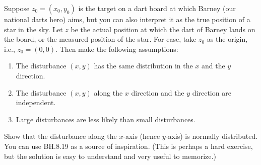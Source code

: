 \begin{exercise}\label{ex:1}
Suppose $z_0=(x_0,y_{0})$ is the target on a dart board at which Barney (our national darts hero) aims, but you can also interpret it as the true position of a star in the sky.
Let $z$ be the actual position at which the dart of Barney lands on the board, or the measured position of the star.
For ease, take $z_0$ as the origin, i.e., $z_0=(0,0)$.
Then make the following assumptions:
\begin{enumerate}
\item The disturbance $(x,y)$ has the same distribution in the $x$ and the $y$ direction.
\item The disturbance $(x,y)$ along the $x$ direction and the $y$ direction are independent.
\item Large disturbances are less likely than small disturbances.
\end{enumerate}
Show that the disturbance along the $x$-axis (hence $y$-axis) is normally distributed. You can use BH.8.19 as a source of inspiration. (This is perhaps a hard exercise, but  the solution is easy to understand and very useful to memorize.)


\end{exercise}
